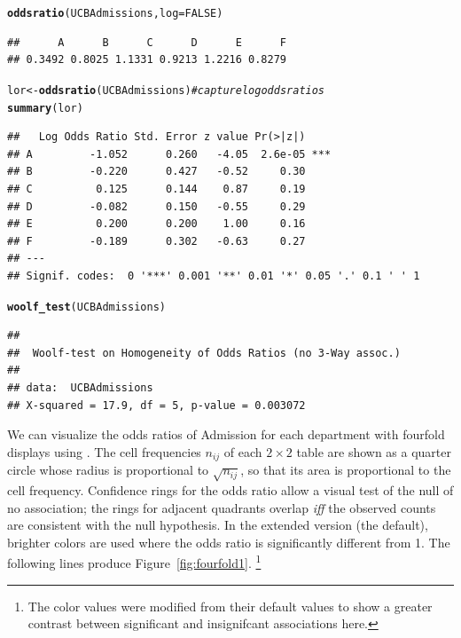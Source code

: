 \documentclass[10pt,twoside]{article}\usepackage[]{graphicx}\usepackage[]{color}
\makeatletter
\newcommand{\hlnum}[1]{\textcolor[rgb]{0.686,0.059,0.569}{#1}}%
\newcommand{\hlcom}[1]{\textcolor[rgb]{0.678,0.584,0.686}{\textit{#1}}}%
\newcommand{\hlstd}[1]{\textcolor[rgb]{0.345,0.345,0.345}{#1}}%
\newcommand{\hlkwb}[1]{\textcolor[rgb]{0.69,0.353,0.396}{#1}}%
\newcommand{\hlkwc}[1]{\textcolor[rgb]{0.333,0.667,0.333}{#1}}%
\newcommand{\hlkwd}[1]{\textcolor[rgb]{0.737,0.353,0.396}{\textbf{#1}}}%
\newenvironment{kframe}{%
 \def\at@end@of@kframe{}%
 \ifinner\ifhmode%
  \def\at@end@of@kframe{\end{minipage}}%
  \begin{minipage}{\columnwidth}%
 \fi\fi%
 \def\FrameCommand##1{\hskip\@totalleftmargin \hskip-\fboxsep
 \colorbox{shadecolor}{##1}\hskip-\fboxsep
     \hskip-\linewidth \hskip-\@totalleftmargin \hskip\columnwidth}%
 \MakeFramed {\advance\hsize-\width
   \@totalleftmargin\z@ \linewidth\hsize
   \@setminipage}}%
 {\par\unskip\endMakeFramed%
 \at@end@of@kframe}
\newenvironment{knitrout}{}{} %
\newcommand{\figref}[1]{Figure~\ref{#1}}
\newcommand{\codefun}[1]{\code{#1()}}
\makeatother
\begin{document}
%
\begin{knitrout}
\color{fgcolor}\begin{kframe}
\begin{alltt}
\hlkwd{oddsratio}\hlstd{(UCBAdmissions,} \hlkwc{log}\hlstd{=}\hlnum{FALSE}\hlstd{)}
\end{alltt}
\begin{verbatim}
##      A      B      C      D      E      F 
## 0.3492 0.8025 1.1331 0.9213 1.2216 0.8279
\end{verbatim}
\begin{alltt}
\hlstd{lor} \hlkwb{<-} \hlkwd{oddsratio}\hlstd{(UCBAdmissions)}  \hlcom{# capture log odds ratios}
\hlkwd{summary}\hlstd{(lor)}
\end{alltt}
\begin{verbatim}
##   Log Odds Ratio Std. Error z value Pr(>|z|)    
## A         -1.052      0.260   -4.05  2.6e-05 ***
## B         -0.220      0.427   -0.52     0.30    
## C          0.125      0.144    0.87     0.19    
## D         -0.082      0.150   -0.55     0.29    
## E          0.200      0.200    1.00     0.16    
## F         -0.189      0.302   -0.63     0.27    
## ---
## Signif. codes:  0 '***' 0.001 '**' 0.01 '*' 0.05 '.' 0.1 ' ' 1
\end{verbatim}
\begin{alltt}
\hlkwd{woolf_test}\hlstd{(UCBAdmissions)}
\end{alltt}
\begin{verbatim}
## 
## 	Woolf-test on Homogeneity of Odds Ratios (no 3-Way assoc.)
## 
## data:  UCBAdmissions
## X-squared = 17.9, df = 5, p-value = 0.003072
\end{verbatim}
\end{kframe}
\end{knitrout}


We  can visualize the  odds ratios of  Admission for
each  department  with  fourfold  displays  using  \codefun{fourfold}.  The cell
frequencies $n_{ij}$  of each  $2 \times  2$ table  are shown  as a  quarter circle whose
radius is proportional to $\sqrt{n_{ij}}$, so  that its area is proportional to  the
cell frequency.
Confidence rings for the odds ratio allow a visual test of the null of no association; 
the rings for adjacent quadrants overlap \emph{iff} the observed counts are consistent 
with the null hypothesis.  In the extended version (the default), brighter colors
are used where the odds ratio is significantly different from 1.
The following lines produce \figref{fig:fourfold1}.%
\footnote{The color values  were modified from their default values
to show a greater contrast between significant and insignifcant associations here.}
\end{document}
